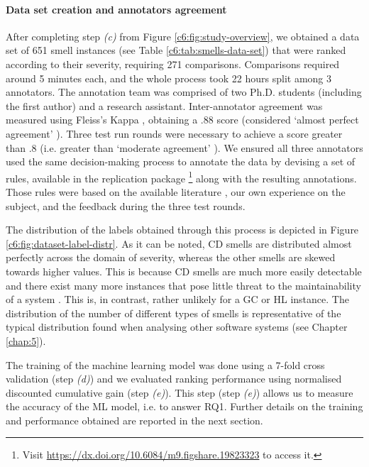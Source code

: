 \paragraph{Data set creation and annotators agreement}
After completing step \emph{(c)} from Figure \ref{c6:fig:study-overview}, we obtained a data set of 651 smell instances (see Table \ref{c6:tab:smells-data-set}) that were ranked according to their severity, requiring 271 comparisons.
Comparisons required around 5 minutes each, and the whole process took 22 hours split among 3 annotators.
The annotation team was comprised of two Ph.D. students (including the first author) and a research assistant.
Inter-annotator agreement was measured using Fleiss's Kappa \cite{Fleiss1971}, obtaining a $.88$ score (considered `almost perfect agreement' \cite{Fleiss1971}).
Three test run rounds were necessary to achieve a score greater than $.8$ (i.e. greater than `moderate agreement' \cite{Fleiss1971}). 
We ensured all three annotators used the same decision-making process to annotate the data by devising a set of rules, available in the replication package \footnote{Visit \url{https://dx.doi.org/10.6084/m9.figshare.19823323} to access it.} along with the resulting annotations.
Those rules were based on the available literature \cite{Laval2012,AlMutawa2014}, our own experience on the subject, and the feedback during the three test rounds.

The distribution of the labels obtained through this process is depicted in Figure \ref{c6:fig:dataset-label-distr}.
As it can be noted, CD smells are distributed almost perfectly across the domain of severity, whereas the other smells are skewed towards higher values.
This is because CD smells are much more easily detectable and there exist many more instances that pose little threat to the maintainability of a system \cite{AlMutawa2014,Laval2012}.
This is, in contrast, rather unlikely for a GC or HL instance.
The distribution of the number of different types of smells is representative of the typical distribution found when analysing other software systems (see Chapter \ref{chap:5}).

The training of the machine learning model was done using a 7-fold cross validation (step \emph{(d)}) and we evaluated ranking performance using normalised discounted cumulative gain (step \emph{(e)}).
This step (step \emph{(e)}) allows us to measure the accuracy of the ML model, i.e. to answer RQ1.
Further details on the training and performance obtained are reported in the next section.

